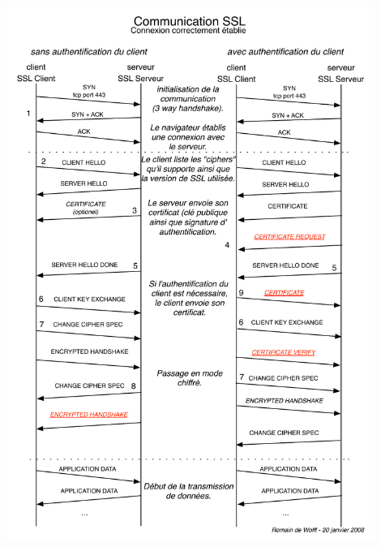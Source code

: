 \documentclass[10pt,a4paper,titlepage]{article}
\begin{document}
\includegraphics[width=12cm]{CommunicationSSL.pdf} 
\end{document}
